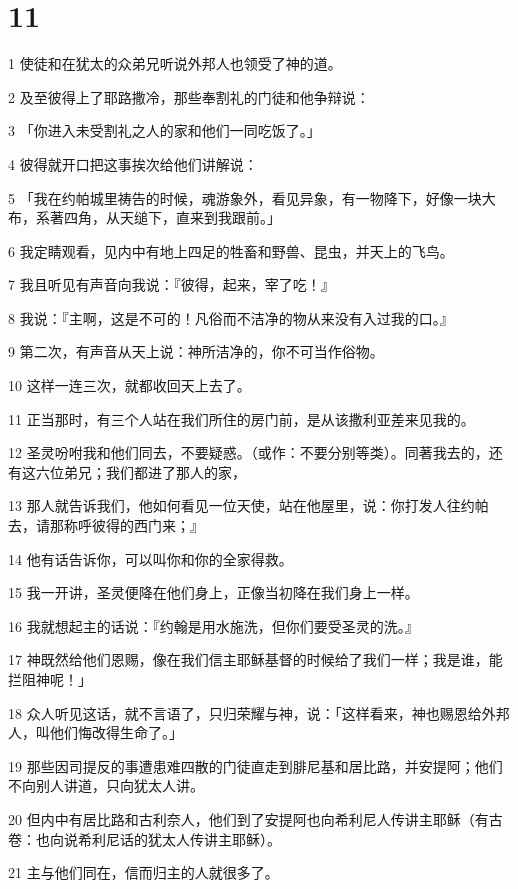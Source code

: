 \chapter{11}

\par 1 使徒和在犹太的众弟兄听说外邦人也领受了神的道。
\par 2 及至彼得上了耶路撒冷，那些奉割礼的门徒和他争辩说：
\par 3 「你进入未受割礼之人的家和他们一同吃饭了。」
\par 4 彼得就开口把这事挨次给他们讲解说：
\par 5 「我在约帕城里祷告的时候，魂游象外，看见异象，有一物降下，好像一块大布，系著四角，从天缒下，直来到我跟前。」
\par 6 我定睛观看，见内中有地上四足的牲畜和野兽、昆虫，并天上的飞鸟。
\par 7 我且听见有声音向我说：『彼得，起来，宰了吃！』
\par 8 我说：『主啊，这是不可的！凡俗而不洁净的物从来没有入过我的口。』
\par 9 第二次，有声音从天上说：神所洁净的，你不可当作俗物。
\par 10 这样一连三次，就都收回天上去了。
\par 11 正当那时，有三个人站在我们所住的房门前，是从该撒利亚差来见我的。
\par 12 圣灵吩咐我和他们同去，不要疑惑。（或作：不要分别等类）。同著我去的，还有这六位弟兄；我们都进了那人的家，
\par 13 那人就告诉我们，他如何看见一位天使，站在他屋里，说：你打发人往约帕去，请那称呼彼得的西门来；』
\par 14 他有话告诉你，可以叫你和你的全家得救。
\par 15 我一开讲，圣灵便降在他们身上，正像当初降在我们身上一样。
\par 16 我就想起主的话说：『约翰是用水施洗，但你们要受圣灵的洗。』
\par 17 神既然给他们恩赐，像在我们信主耶稣基督的时候给了我们一样；我是谁，能拦阻神呢！」
\par 18 众人听见这话，就不言语了，只归荣耀与神，说：「这样看来，神也赐恩给外邦人，叫他们悔改得生命了。」
\par 19 那些因司提反的事遭患难四散的门徒直走到腓尼基和居比路，并安提阿；他们不向别人讲道，只向犹太人讲。
\par 20 但内中有居比路和古利奈人，他们到了安提阿也向希利尼人传讲主耶稣（有古卷：也向说希利尼话的犹太人传讲主耶稣）。
\par 21 主与他们同在，信而归主的人就很多了。
